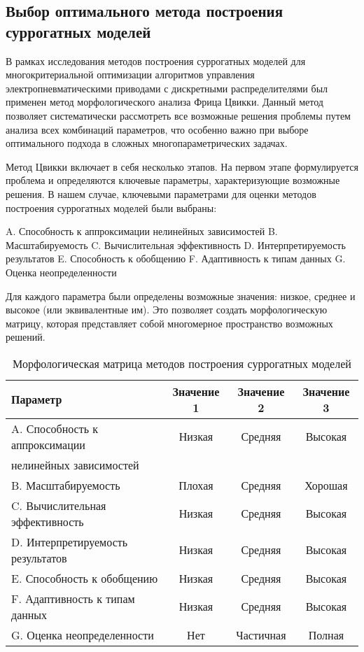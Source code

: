 \subsection{Выбор оптимального метода построения суррогатных моделей}\label{sec:ch4/sec2/subsec2}

В рамках исследования методов построения суррогатных моделей
для многокритериальной оптимизации алгоритмов управления
электропневматическими приводами с дискретными распределителями
был применен метод морфологического анализа Фрица Цвикки. Данный
метод позволяет систематически рассмотреть все возможные решения
проблемы путем анализа всех комбинаций параметров, что особенно важно
при выборе оптимального подхода в сложных многопараметрических задачах.

Метод Цвикки включает в себя несколько этапов. На первом этапе
формулируется проблема и определяются ключевые параметры,
характеризующие возможные решения. В нашем случае, ключевыми
параметрами для оценки методов построения суррогатных моделей были выбраны:

A. Способность к аппроксимации нелинейных зависимостей
B. Масштабируемость
C. Вычислительная эффективность
D. Интерпретируемость результатов
E. Способность к обобщению
F. Адаптивность к типам данных
G. Оценка неопределенности

Для каждого параметра были определены возможные значения:
низкое, среднее и высокое (или эквивалентные им).
Это позволяет создать морфологическую матрицу,
которая представляет собой многомерное пространство возможных решений.

\begin{table}[h]
    \centering
    \caption{Морфологическая матрица методов построения суррогатных моделей}
    \begin{tabular}{|l|c|c|c|}
        \hline
        Параметр                          & Значение 1 & Значение 2 & Значение 3 \\
        \hline
        A. Способность к аппроксимации    & Низкая     & Средняя    & Высокая    \\
        нелинейных зависимостей           &            &            &            \\
        \hline
        B. Масштабируемость               & Плохая     & Средняя    & Хорошая    \\
        \hline
        C. Вычислительная эффективность   & Низкая     & Средняя    & Высокая    \\
        \hline
        D. Интерпретируемость результатов & Низкая     & Средняя    & Высокая    \\
        \hline
        E. Способность к обобщению        & Низкая     & Средняя    & Высокая    \\
        \hline
        F. Адаптивность к типам данных    & Низкая     & Средняя    & Высокая    \\
        \hline
        G. Оценка неопределенности        & Нет        & Частичная  & Полная     \\
        \hline
    \end{tabular}
    \label{tab:morphological_matrix}
\end{table}

